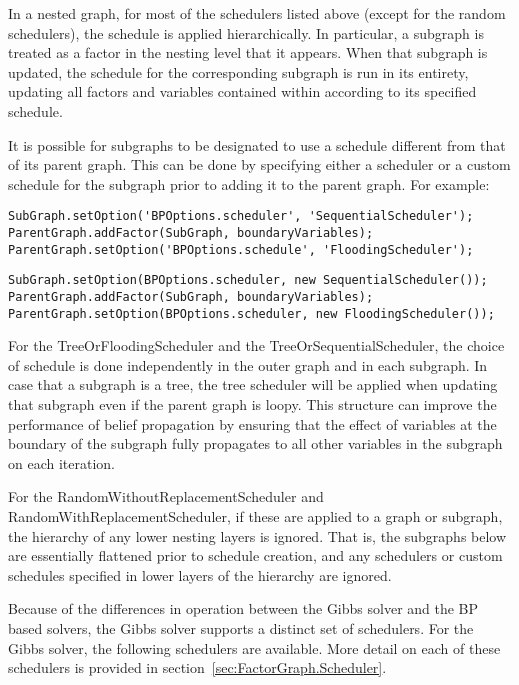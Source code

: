 In a nested graph, for most of the schedulers listed above (except for the random schedulers), the schedule is applied hierarchically.  In particular, a subgraph is treated as a factor in the nesting level that it appears.  When that subgraph is updated, the schedule for the corresponding subgraph is run in its entirety, updating all factors and variables contained within according to its specified schedule.

It is possible for subgraphs to be designated to use a schedule different from that of its parent graph.  This can be done by specifying either a scheduler or a custom schedule for the subgraph prior to adding it to the parent graph.  For example:

\ifmatlab

\begin{lstlisting}
SubGraph.setOption('BPOptions.scheduler', 'SequentialScheduler');
ParentGraph.addFactor(SubGraph, boundaryVariables);
ParentGraph.setOption('BPOptions.schedule', 'FloodingScheduler');
\end{lstlisting}

\fi

\ifjava

\begin{lstlisting}
SubGraph.setOption(BPOptions.scheduler, new SequentialScheduler());
ParentGraph.addFactor(SubGraph, boundaryVariables);
ParentGraph.setOption(BPOptions.scheduler, new FloodingScheduler());
\end{lstlisting}

\fi

For the TreeOrFloodingScheduler and the TreeOrSequentialScheduler, the choice of schedule is done independently in the outer graph and in each subgraph.  In case that a subgraph is a tree, the tree scheduler will be applied when updating that subgraph even if the parent graph is loopy.  This structure can improve the performance of belief propagation by ensuring that the effect of variables at the boundary of the subgraph fully propagates to all other variables in the subgraph on each iteration.

For the RandomWithoutReplacementScheduler and RandomWithReplacementScheduler, if these are applied to a graph or subgraph, the hierarchy of any lower nesting layers is ignored.  That is, the subgraphs below are essentially flattened prior to schedule creation, and any schedulers or custom schedules specified in lower layers of the hierarchy are ignored.


Because of the differences in operation between the Gibbs solver and the BP based solvers, the Gibbs solver supports a distinct set of schedulers.  For the Gibbs solver, the following schedulers are available.  More detail on each of these schedulers is provided in section~\ref{sec:FactorGraph.Scheduler}.

